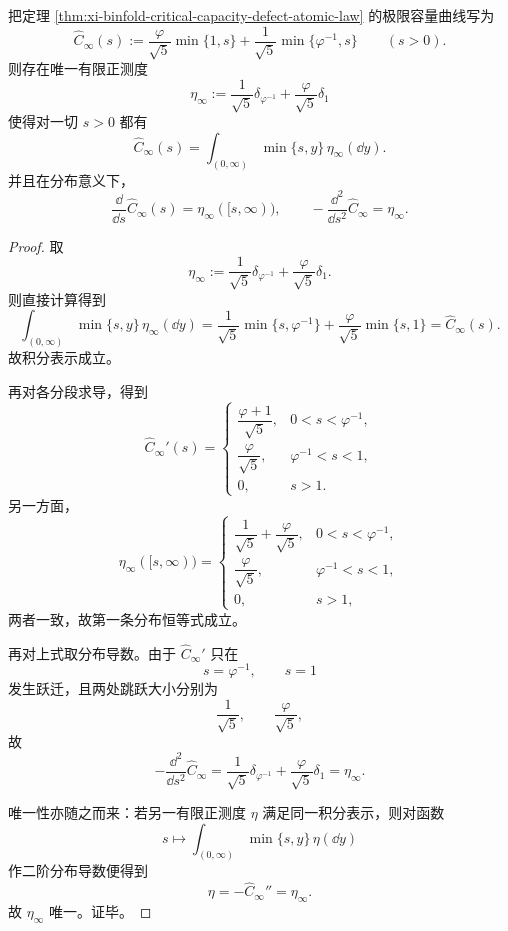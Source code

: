 \begin{theorem}\label{thm:xi-binfold-capacity-atomic-measure-unique-recovery}
把定理 \ref{thm:xi-binfold-critical-capacity-defect-atomic-law} 的极限容量曲线写为
\[
\widehat C_\infty(s)
:=
\frac{\varphi}{\sqrt5}\min\{1,s\}
+
\frac{1}{\sqrt5}\min\{\varphi^{-1},s\}
\qquad (s>0).
\]
则存在唯一有限正测度
\[
\boxed{\;
\eta_\infty
:=
\frac{1}{\sqrt5}\delta_{\varphi^{-1}}
+
\frac{\varphi}{\sqrt5}\delta_{1}\;}
\]
使得对一切 \(s>0\) 都有
\[
\boxed{\;
\widehat C_\infty(s)=\int_{(0,\infty)}\min\{s,y\}\,\eta_\infty(\dd y).\;}
\]
并且在分布意义下，
\[
\boxed{\;
\frac{\dd}{\dd s}\widehat C_\infty(s)=\eta_\infty([s,\infty)),
\qquad
-\frac{\dd^2}{\dd s^2}\widehat C_\infty=\eta_\infty.\;}
\]
\end{theorem}
\begin{proof}
取
\[
\eta_\infty
:=
\frac{1}{\sqrt5}\delta_{\varphi^{-1}}
+
\frac{\varphi}{\sqrt5}\delta_1.
\]
则直接计算得到
\[
\int_{(0,\infty)}\min\{s,y\}\,\eta_\infty(\dd y)
=
\frac{1}{\sqrt5}\min\{s,\varphi^{-1}\}
+
\frac{\varphi}{\sqrt5}\min\{s,1\}
=
\widehat C_\infty(s).
\]
故积分表示成立。

再对各分段求导，得到
\[
\widehat C_\infty'(s)=
\begin{cases}
\dfrac{\varphi+1}{\sqrt5},& 0<s<\varphi^{-1},\\[2mm]
\dfrac{\varphi}{\sqrt5},& \varphi^{-1}<s<1,\\[2mm]
0,& s>1.
\end{cases}
\]
另一方面，
\[
\eta_\infty([s,\infty))=
\begin{cases}
\dfrac{1}{\sqrt5}+\dfrac{\varphi}{\sqrt5},& 0<s<\varphi^{-1},\\[2mm]
\dfrac{\varphi}{\sqrt5},& \varphi^{-1}<s<1,\\[2mm]
0,& s>1,
\end{cases}
\]
两者一致，故第一条分布恒等式成立。

再对上式取分布导数。由于 \(\widehat C_\infty'\) 只在
\[
s=\varphi^{-1},\qquad s=1
\]
发生跃迁，且两处跳跃大小分别为
\[
\frac{1}{\sqrt5},
\qquad
\frac{\varphi}{\sqrt5},
\]
故
\[
-\frac{\dd^2}{\dd s^2}\widehat C_\infty
=
\frac{1}{\sqrt5}\delta_{\varphi^{-1}}
+
\frac{\varphi}{\sqrt5}\delta_1
=
\eta_\infty.
\]

唯一性亦随之而来：若另一有限正测度 \(\eta\) 满足同一积分表示，则对函数
\[
s\longmapsto \int_{(0,\infty)}\min\{s,y\}\,\eta(\dd y)
\]
作二阶分布导数便得到
\[
\eta=-\widehat C_\infty''=\eta_\infty.
\]
故 \(\eta_\infty\) 唯一。证毕。
\end{proof}

